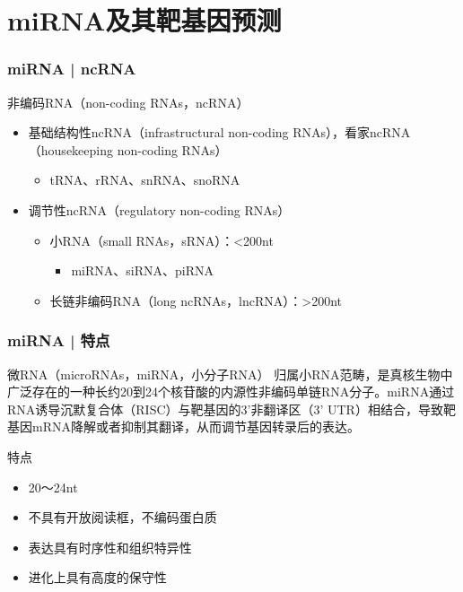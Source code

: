 \section{miRNA及其靶基因预测}
\begin{frame}
	\frametitle{miRNA | ncRNA}
	\begin{block}{非编码RNA（non-coding RNAs，ncRNA）}
	\begin{itemize}
		\item 基础结构性ncRNA（infrastructural non-coding RNAs），看家ncRNA（housekeeping non-coding RNAs）
			\begin{itemize}
				\item tRNA、rRNA、snRNA、snoRNA
			\end{itemize}
		\item 调节性ncRNA（regulatory non-coding RNAs）
			\begin{itemize}
				\item 小RNA（small RNAs，sRNA）：\textless 200nt
					\begin{itemize}
						\item miRNA、siRNA、piRNA
					\end{itemize}
				\item 长链非编码RNA（long ncRNAs，lncRNA）：\textgreater 200nt
			\end{itemize}
	\end{itemize}
\end{block}
\end{frame}

\begin{frame}
	\frametitle{miRNA | 特点}
	\begin{block}{微RNA（microRNAs，miRNA，小分子RNA）}
		归属小RNA范畴，是真核生物中广泛存在的一种长约20到24个核苷酸的内源性非编码单链RNA分子。miRNA通过RNA诱导沉默复合体（RISC）与靶基因的3'非翻译区（3' UTR）相结合，导致靶基因mRNA降解或者抑制其翻译，从而调节基因转录后的表达。
	\end{block}
	\pause
	\begin{block}{特点}
		\begin{itemize}
			\item 20～24nt
			\item 不具有开放阅读框，不编码蛋白质
			\item 表达具有时序性和组织特异性
			\item 进化上具有高度的保守性
		\end{itemize}
	\end{block}
\end{frame}

